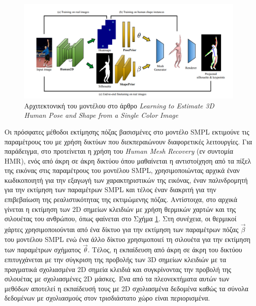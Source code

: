 \begin{figure}[H]
	\centering
	\includegraphics[scale=0.4]{images/chapter2/3d_pose_estimation/pavlakos_single_image.png}
	\caption{Αρχιτεκτονική του μοντέλου στο άρθρο \textsl{Learning to Estimate 3D Human Pose and Shape from a Single Color Image}}
	\label{fig:pavlakos_single_image}
\end{figure}

Οι πρόσφατες μέθοδοι εκτίμησης πόζας βασισμένες στο μοντέλο SMPL εκτιμούνε τις παραμέτρους του με χρήση δικτύων που διεκπεραιώνουν διαφορετικές λειτουργίες. Για παράδειγμα, στο \cite{hmr_paper} προτείνεται η χρήση του \textsl{Human Mesh Recovery} (εν συντομία HMR), ενός από άκρη σε άκρη δικτύου όπου μαθαίνεται η αντιστοίχηση από τα πίξελ της εικόνας στις παραμέτρους του μοντέλου SMPL, χρησιμοποιώντας αρχικά έναν κωδικοποιητή για την εξαγωγή των χαρακτηριστικών της εικόνας, έναν παλινδρομητή για την εκτίμηση των παραμέτρων SMPL και τέλος έναν διακριτή για την επιβεβαίωση της ρεαλιστικότητας της εκτιμώμενης πόζας. Αντίστοιχα, στο \cite{estimate_from_single_color_paper} αρχικά γίνεται η εκτίμηση των 2D σημείων κλειδιών με χρήση θερμικών χαρτών και της σιλουέτας του ανθρώπου, όπως φαίνεται στο Σχήμα \ref{fig:pavlakos_single_image}. Στη συνέχεια, οι θερμικοί χάρτες χρησιμοποιούνται από ένα δίκτυο για την εκτίμηση των παραμέτρων πόζας $\vec{\beta}$ του μοντέλου SMPL ενώ ένα άλλο δίκτυο χρησιμοποιεί τη σιλουέτα για την εκτίμηση των παραμέτρων σχήματος $\vec{\theta}$. Τέλος, η εκπαίδευση από άκρη σε άκρη του δικτύου επιτυγχάνεται με την σύγκριση της προβολής των 3D σημείων κλειδιών με τα πραγματικά σχολιασμένα 2D σημεία κλειδιά και συγκρίνοντας την προβολή της σιλουέτας με σχολιασμένες 2D μάσκες. Ένα από τα πλεονεκτήματα αυτών των μεθόδων αποτελεί η εκπαίδευσή τους με 2D σχολιασμένα δεδομένα καθώς τα σύνολα δεδομένων με σχολιασμούς στον τρισδιάστατο χώρο είναι περιορισμένα.

